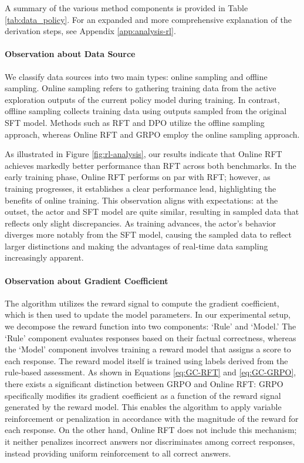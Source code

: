 \begin{itemize}[topsep=0pt]
A summary of the various method components is provided in Table \ref{tab:data_policy}. For an expanded and more comprehensive explanation of the derivation steps, see Appendix \ref{app:analysis-rl}.

\paragraph{Observation about Data Source} We classify data sources into two main types: online sampling and offline sampling. Online sampling refers to gathering training data from the active exploration outputs of the current policy model during training. In contrast, offline sampling collects training data using outputs sampled from the original SFT model. Methods such as RFT and DPO utilize the offline sampling approach, whereas Online RFT and GRPO employ the online sampling approach.

As illustrated in Figure \ref{fig:rl-analysis}, our results indicate that Online RFT achieves markedly better performance than RFT across both benchmarks. In the early training phase, Online RFT performs on par with RFT; however, as training progresses, it establishes a clear performance lead, highlighting the benefits of online training. This observation aligns with expectations: at the outset, the actor and SFT model are quite similar, resulting in sampled data that reflects only slight discrepancies. As training advances, the actor’s behavior diverges more notably from the SFT model, causing the sampled data to reflect larger distinctions and making the advantages of real-time data sampling increasingly apparent.

\paragraph{Observation about Gradient Coefficient} The algorithm utilizes the reward signal to compute the gradient coefficient, which is then used to update the model parameters. In our experimental setup, we decompose the reward function into two components: `Rule' and `Model.' The `Rule' component evaluates responses based on their factual correctness, whereas the `Model' component involves training a reward model that assigns a score to each response. The reward model itself is trained using labels derived from the rule-based assessment. As shown in Equations \ref{eq:GC-RFT} and \ref{eq:GC-GRPO}, there exists a significant distinction between GRPO and Online RFT: GRPO specifically modifies its gradient coefficient as a function of the reward signal generated by the reward model. This enables the algorithm to apply variable reinforcement or penalization in accordance with the magnitude of the reward for each response. On the other hand, Online RFT does not include this mechanism; it neither penalizes incorrect answers nor discriminates among correct responses, instead providing uniform reinforcement to all correct answers.


\end{itemize}
